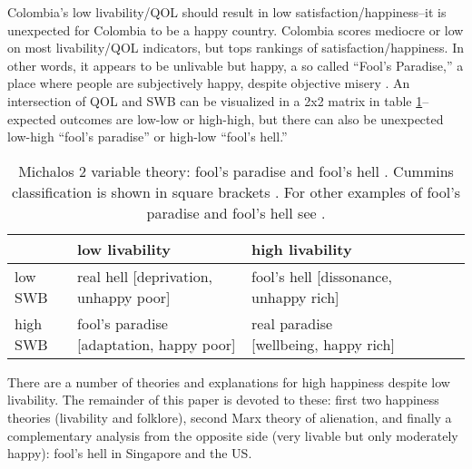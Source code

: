 \documentclass[10pt, letterpaper]{article}
\begin{document}
\begin{spacing}{2}
 Colombia's %
low livability/QOL  %
 should result in low satisfaction/happiness--it is unexpected for Colombia to
 be a happy country.  
%
 Colombia scores mediocre or low on most livability/QOL indicators, 
but tops rankings of satisfaction/happiness. %
 In other words, it appears to be unlivable but happy,
a so called ``Fool's Paradise,'' a place where people are subjectively happy,
despite objective misery \citep{michalos14B}.
An intersection of QOL and SWB can be visualized in a 2x2 matrix in table \ref{tab:2}--expected
outcomes are low-low or  high-high, but there can also be unexpected low-high ``fool's
paradise'' or high-low ``fool's hell.''


\begin{table}[h!]
  \centering
  \begin{tabular}{l|llllll}
\hline          &low livability&high livability\\\hline
    low SWB&real hell [deprivation, unhappy poor]&fool's hell [dissonance, unhappy rich]\\
    high SWB&fool's paradise [adaptation, happy poor]&real paradise [wellbeing, happy rich]\\\hline
  \end{tabular}
  \caption{Michalos 2 variable theory: fool's paradise and fool's hell
    \citep{michalos14B}. Cummins classification is shown in square brackets
    \citep[][p.61]{sirgy02}. %
    For other examples of fool's
paradise and fool's hell see \citet{aok-swbLivability18}.}
  \label{tab:2}
\end{table}

There are a number of theories and explanations for high happiness despite low
livability. The remainder of this paper is devoted to these: first two happiness
theories (livability and folklore), second Marx theory of alienation, and
finally a complementary analysis from the opposite side (very livable but only
moderately happy): fool's hell in Singapore and the US.  


\end{spacing}
\end{document}
